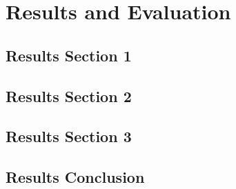 %
\chapter{Results and Evaluation}
\label{sec:results}


\Blindtext[2][1]

\section{Results Section 1}
\label{sec:related:sec1}

\Blindtext[2][2]

\section{Results Section 2}
\label{sec:results:sec2}

\Blindtext[3][2]

\section{Results Section 3}
\label{sec:results:sec3}

\Blindtext[4][2]

\section{Results Conclusion}
\label{sec:results:conclusion}

\Blindtext[2][1]
